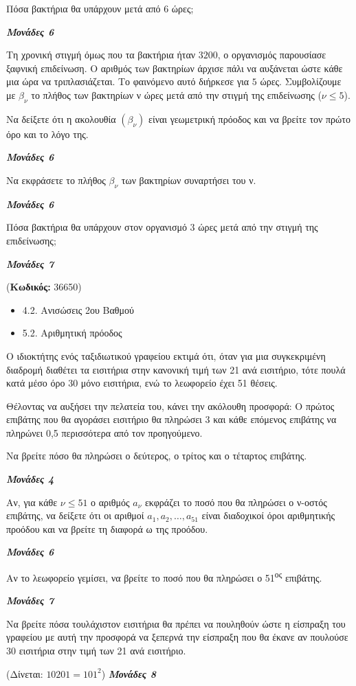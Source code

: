 \documentclass[11pt,a4paper,twoside]{book}
\newcounter{askhsh}[chapter]
\renewcommand{\theaskhsh}{
	\bf{\titlefont{\Large{\thechapter}}.\arabic{askhsh}}
}
\newcommand{\Askhsh}[2]{\refstepcounter{askhsh}{\titlefont{Άσκηση\theaskhsh} - \textcolor{maincolor}{ΘΕΜΑ #2}} ({\small{\textbf{Κωδικός:} #1}})\\}{}
\newenvironment{ylh}{
\begin{tcolorbox}[
breakable,
enhanced standard,
titlerule=0pt,
toprule=0pt, 
rightrule=0pt, 
bottomrule=0pt,
title={\titlefont Ύλη άσκησης},
colback=white,
opacityback=0,
left=2mm,
top=1mm,
bottom=0mm,
boxrule=0pt,
colframe=white,
borderline west={1.5mm}{0pt}{secondarycolor},
leftrule=2mm,
sharp corners,
coltitle=black
]
\begin{itemize}[leftmargin=3mm, itemsep=0mm, label=\textcolor{secondarycolor}{{\small\faBook}}]
}{
\end{itemize}
\end{tcolorbox}
}
\newcommand{\monades}[1]{
\hspace*{\fill}
\textbf{\textit{\textcolor{maincolor}{Μονάδες #1}}}}
\begin{document}
\begin{alist}
\item Πόσα βακτήρια θα υπάρχουν μετά από $6$ ώρες;
\monades{6}
\item Τη χρονική στιγμή όμως που τα βακτήρια ήταν $3200$, ο οργανισμός παρουσίασε ξαφνική επιδείνωση. Ο αριθμός των βακτηρίων άρχισε πάλι να αυξάνεται ώστε κάθε μια ώρα να τριπλασιάζεται. Το φαινόμενο αυτό διήρκεσε για $5$ ώρες. Συμβολίζουμε με $\beta_\nu$ το πλήθος των βακτηρίων ν ώρες μετά από την στιγμή της επιδείνωσης ($\nu \le 5$).
\begin{rlist}
\item
  Να δείξετε ότι η ακολουθία $(\beta_\nu)$ είναι γεωμετρική πρόοδος και να βρείτε τον πρώτο όρο και το λόγο της.
\monades{6}
\item
  Να εκφράσετε το πλήθος $\beta_\nu$ των βακτηρίων συναρτήσει του ν.
\monades{6}
\item
  Πόσα βακτήρια θα υπάρχουν στον οργανισμό $3$ ώρες μετά από την στιγμή της επιδείνωσης;
\monades{7}
\end{rlist}
\end{alist}

\vspace{4mm}
\Askhsh{36650}{4}
\begin{ylh}
    \item 4.2. Ανισώσεις 2ου Βαθμού
    \item 5.2. Αριθμητική πρόοδος
\end{ylh}

Ο ιδιοκτήτης ενός ταξιδιωτικού γραφείου εκτιμά ότι, όταν για μια συγκεκριμένη διαδρομή διαθέτει τα εισιτήρια στην κανονική τιμή των 21\text{\euro} ανά εισιτήριο, τότε πουλά κατά μέσο όρο 30 μόνο εισιτήρια, ενώ το λεωφορείο έχει 51 θέσεις.

Θέλοντας να αυξήσει την πελατεία του, κάνει την ακόλουθη προσφορά: Ο πρώτος επιβάτης που θα αγοράσει εισιτήριο θα πληρώσει 3\text{\euro} και κάθε επόμενος επιβάτης να πληρώνει 0,5\text{\euro} περισσότερα από τον προηγούμενο.

\begin{alist}
\item Να βρείτε πόσο θα πληρώσει ο δεύτερος, ο τρίτος και ο τέταρτος επιβάτης.

\monades{4}
\item Αν, για κάθε $\nu \le 51$ ο αριθμός $a_\nu$ εκφράζει το ποσό που θα πληρώσει ο ν-οστός επιβάτης, να δείξετε ότι οι αριθμοί $a_1, a_2, \dots, a_{51}$ είναι διαδοχικοί όροι αριθμητικής προόδου και να βρείτε τη διαφορά ω της προόδου.
\monades{6}
\item Αν το λεωφορείο γεμίσει, να βρείτε το ποσό που θα πληρώσει ο 51\textsuperscript{ος} επιβάτης.

\monades{7}
\item Να βρείτε πόσα τουλάχιστον εισιτήρια θα πρέπει να πουληθούν ώστε η είσπραξη του γραφείου με αυτή την προσφορά να ξεπερνά την είσπραξη που θα έκανε αν πουλούσε 30 εισιτήρια στην τιμή των 21\text{\euro} ανά εισιτήριο.

(Δίνεται: $10201 = 101^2$) \monades{8}
\end{alist}
\end{document}
